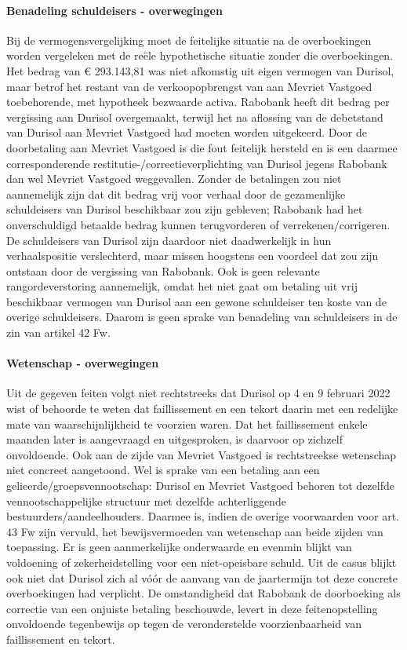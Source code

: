 \documentclass[
  dutch,
  a4paper,
]{article}
\begin{document}
\paragraph{Benadeling schuldeisers - overwegingen}\label{benadeling-schuldeisers---overwegingen-10}

Bij de vermogensvergelijking moet de feitelijke situatie na de overboekingen worden vergeleken met de reële hypothetische situatie zonder die overboekingen. Het bedrag van € 293.143,81 was niet afkomstig uit eigen vermogen van Durisol, maar betrof het restant van de verkoopopbrengst van aan Mevriet Vastgoed toebehorende, met hypotheek bezwaarde activa. Rabobank heeft dit bedrag per vergissing aan Durisol overgemaakt, terwijl het na aflossing van de debetstand van Durisol aan Mevriet Vastgoed had moeten worden uitgekeerd. Door de doorbetaling aan Mevriet Vastgoed is die fout feitelijk hersteld en is een daarmee corresponderende restitutie-/correctieverplichting van Durisol jegens Rabobank dan wel Mevriet Vastgoed weggevallen. Zonder de betalingen zou niet aannemelijk zijn dat dit bedrag vrij voor verhaal door de gezamenlijke schuldeisers van Durisol beschikbaar zou zijn gebleven; Rabobank had het onverschuldigd betaalde bedrag kunnen terugvorderen of verrekenen/corrigeren. De schuldeisers van Durisol zijn daardoor niet daadwerkelijk in hun verhaalspositie verslechterd, maar missen hoogstens een voordeel dat zou zijn ontstaan door de vergissing van Rabobank. Ook is geen relevante rangordeverstoring aannemelijk, omdat het niet gaat om betaling uit vrij beschikbaar vermogen van Durisol aan een gewone schuldeiser ten koste van de overige schuldeisers. Daarom is geen sprake van benadeling van schuldeisers in de zin van artikel 42 Fw.

\paragraph{Wetenschap - overwegingen}\label{wetenschap---overwegingen-10}

Uit de gegeven feiten volgt niet rechtstreeks dat Durisol op 4 en 9 februari 2022 wist of behoorde te weten dat faillissement en een tekort daarin met een redelijke mate van waarschijnlijkheid te voorzien waren. Dat het faillissement enkele maanden later is aangevraagd en uitgesproken, is daarvoor op zichzelf onvoldoende. Ook aan de zijde van Mevriet Vastgoed is rechtstreekse wetenschap niet concreet aangetoond. Wel is sprake van een betaling aan een gelieerde/groepsvennootschap: Durisol en Mevriet Vastgoed behoren tot dezelfde vennootschappelijke structuur met dezelfde achterliggende bestuurders/aandeelhouders. Daarmee is, indien de overige voorwaarden voor art. 43 Fw zijn vervuld, het bewijsvermoeden van wetenschap aan beide zijden van toepassing. Er is geen aanmerkelijke onderwaarde en evenmin blijkt van voldoening of zekerheidstelling voor een niet-opeisbare schuld. Uit de casus blijkt ook niet dat Durisol zich al vóór de aanvang van de jaartermijn tot deze concrete overboekingen had verplicht. De omstandigheid dat Rabobank de doorboeking als correctie van een onjuiste betaling beschouwde, levert in deze feitenopstelling onvoldoende tegenbewijs op tegen de veronderstelde voorzienbaarheid van faillissement en tekort.
\end{document}
